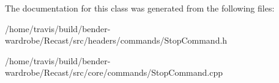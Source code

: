 The documentation for this class was generated from the following files\-:\begin{DoxyCompactItemize}
\item 
/home/travis/build/bender-\/wardrobe/\-Recast/src/headers/commands/Stop\-Command.\-h\item 
/home/travis/build/bender-\/wardrobe/\-Recast/src/core/commands/Stop\-Command.\-cpp\end{DoxyCompactItemize}
